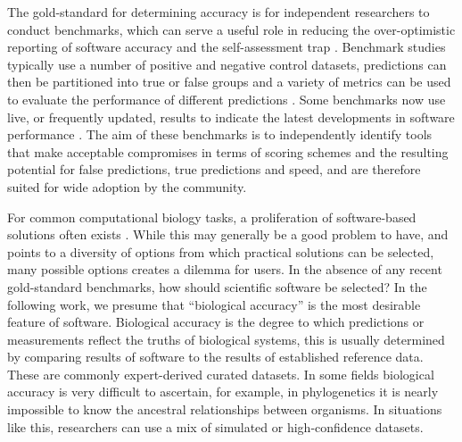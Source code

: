 \documentclass[fleqn,10pt]{SelfArx} %
\begin{document}
The gold-standard for determining accuracy is for independent researchers to conduct benchmarks, which can serve a useful role in reducing the over-optimistic reporting of software accuracy \cite{Boulesteix2010-te,Jelizarow2010-zf} and the self-assessment trap \cite{Norel2011-cq}. Benchmark studies typically use a number of positive and negative control datasets, predictions can then be partitioned into true or false groups and a variety of metrics can be used to evaluate the performance of different predictions \cite{Egan1975-nd,Hall2012-kg}. Some benchmarks now use live, or frequently updated, results to indicate the latest developments in software performance \cite{Bujnicki2001-xr,Puton2014-hy,Barton_undated-er}. The aim of these benchmarks is to independently identify tools that make acceptable compromises in terms of scoring schemes and the resulting potential for false predictions, true predictions and speed, and are therefore suited for wide adoption by the community.

For common computational biology tasks, a proliferation of software-based solutions often exists \cite{Felsenstein1995-ic,Altschul2013-bv,Henry2014-ut,Wikipedia_contributors2015-vj,Wikipedia_contributors2015-hr}. While this may generally be a good problem to have, and points to a diversity of options from which practical solutions can be selected, many possible options creates a dilemma for users. In the absence of any recent gold-standard benchmarks, how should scientific software be selected? In the following work, we presume that ``biological accuracy'' is the most desirable feature of software. Biological accuracy is the degree to which predictions or measurements reflect the truths of biological systems, this is usually determined by comparing results of software to the results of established reference data. These are commonly expert-derived curated datasets. In some fields biological accuracy is very difficult to ascertain, for example, in phylogenetics it is nearly impossible to know the ancestral relationships between organisms. In situations like this, researchers can use a mix of simulated or high-confidence datasets.
\end{document}
